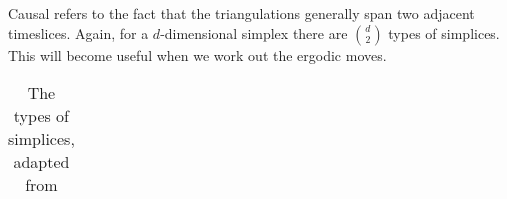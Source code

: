 \documentclass[12pt]{article}
\begin{document}
Causal refers to the fact that the triangulations generally span two adjacent timeslices. Again, for a $d$-dimensional simplex there are $\binom{d}{2}$ types of simplices. This will become useful when we work out the ergodic moves.

\begin{table}
\centering
\begin{tabular}{lccccc}

\end{tabular}
\caption[Simplex types]{The types of simplices, adapted from }
\label{tab:standard-model}
\end{table}



\end{document}
